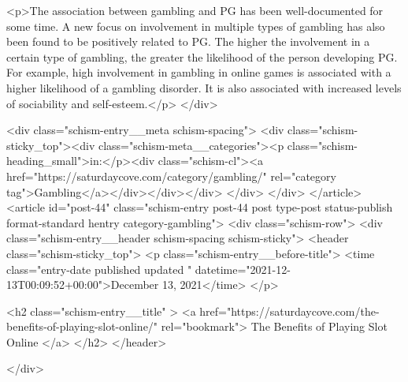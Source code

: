 {<p>The association between gambling and PG has been well-documented for some time. A new focus on involvement in multiple types of gambling has also been found to be positively related to PG. The higher the involvement in a certain type of gambling, the greater the likelihood of the person developing PG. For example, high involvement in gambling in online games is associated with a higher likelihood of a gambling disorder. It is also associated with increased levels of sociability and self-esteem.</p>
		</div>

		<div class="schism-entry__meta schism-spacing">			<div class="schism-sticky_top"><div class="schism-meta__categories"><p class="schism-heading_small">in:</p><div class="schism-cl"><a href="https://saturdaycove.com/category/gambling/" rel="category tag">Gambling</a></div></div></div>		</div>
	</div>
</article>
<article id="post-44" class="schism-entry post-44 post type-post status-publish format-standard hentry category-gambling">
	<div class="schism-row">		<div class="schism-entry__header schism-spacing schism-sticky">			<header class="schism-sticky_top">				<p class="schism-entry__before-title">
					<time class="entry-date published updated " datetime="2021-12-13T00:09:52+00:00">December 13, 2021</time>				</p>

				<h2 class="schism-entry__title" >
					<a href="https://saturdaycove.com/the-benefits-of-playing-slot-online/" rel="bookmark">
						The Benefits of Playing Slot Online					</a>
				</h2>
			</header>

					</div>

}
